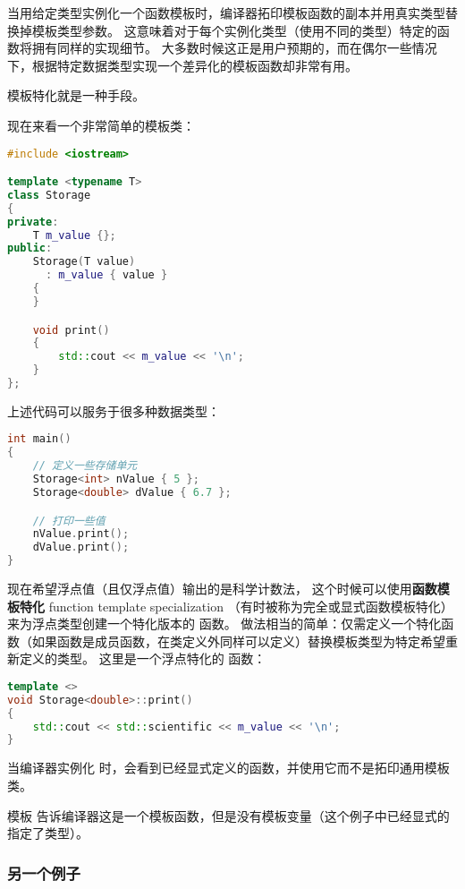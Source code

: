 \documentclass[../../LearnCpp.tex]{subfiles}
\begin{document}

当用给定类型实例化一个函数模板时，编译器拓印模板函数的副本并用真实类型替换掉模板类型参数。
这意味着对于每个实例化类型（使用不同的类型）特定的函数将拥有同样的实现细节。
大多数时候这正是用户预期的，而在偶尔一些情况下，根据特定数据类型实现一个差异化的模板函数却非常有用。

模板特化就是一种手段。

现在来看一个非常简单的模板类：

\begin{lstlisting}[language=C++]
#include <iostream>

template <typename T>
class Storage
{
private:
    T m_value {};
public:
    Storage(T value)
      : m_value { value }
    {
    }

    void print()
    {
        std::cout << m_value << '\n';
    }
};
\end{lstlisting}

上述代码可以服务于很多种数据类型：

\begin{lstlisting}[language=C++]
int main()
{
    // 定义一些存储单元
    Storage<int> nValue { 5 };
    Storage<double> dValue { 6.7 };

    // 打印一些值
    nValue.print();
    dValue.print();
}
\end{lstlisting}

现在希望浮点值（且仅浮点值）输出的是科学计数法，
这个时候可以使用\textbf{函数模板特化} function template specialization
（有时被称为完全或显式函数模板特化）来为浮点类型创建一个特化版本的  函数。
做法相当的简单：仅需定义一个特化函数（如果函数是成员函数，在类定义外同样可以定义）替换模板类型为特定希望重新定义的类型。
这里是一个浮点特化的  函数：

\begin{lstlisting}[language=C++]
template <>
void Storage<double>::print()
{
    std::cout << std::scientific << m_value << '\n';
}
\end{lstlisting}

当编译器实例化  时，会看到已经显式定义的函数，并使用它而不是拓印通用模板类。

模板 \acode{<>} 告诉编译器这是一个模板函数，但是没有模板变量（这个例子中已经显式的指定了类型）。

\subsubsection*{另一个例子}
\end{document}
